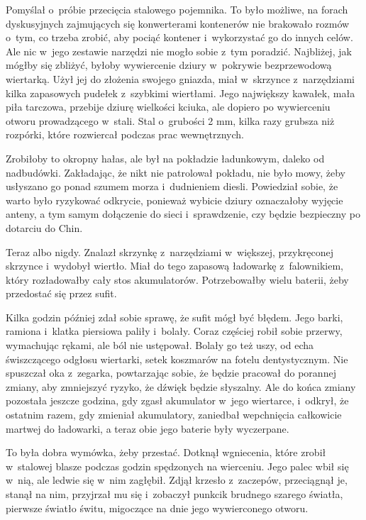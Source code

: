 \documentclass[oneside,polish,11pt,rmheadings]{mwbk}
\begin{document}
Pomyślał o~próbie przecięcia stalowego pojemnika. To było możliwe, na forach dyskusyjnych zajmujących się konwerterami kontenerów nie brakowało rozmów o~tym, co trzeba zrobić, aby pociąć kontener i~wykorzystać go do innych celów. Ale nic w~jego zestawie narzędzi nie mogło sobie z~tym poradzić. Najbliżej, jak mógłby się zbliżyć, byłoby wywiercenie dziury w~pokrywie bezprzewodową wiertarką. Użył jej do złożenia swojego gniazda, miał w~skrzynce z~narzędziami kilka zapasowych pudełek z~szybkimi wiertłami. Jego największy kawałek, mała piła tarczowa, przebije dziurę wielkości kciuka, ale dopiero po wywierceniu otworu prowadzącego w~stali. Stal o~grubości 2 mm, kilka razy grubsza niż rozpórki, które rozwiercał podczas prac wewnętrznych.

Zrobiłoby to okropny hałas, ale był na pokładzie ładunkowym, daleko od nadbudówki. Zakładając, że nikt nie patrolował pokładu, nie było mowy, żeby usłyszano go ponad szumem morza i~dudnieniem diesli. Powiedział sobie, że warto było ryzykować odkrycie, ponieważ wybicie dziury oznaczałoby wyjęcie anteny, a tym samym dołączenie do sieci i~sprawdzenie, czy będzie bezpieczny po dotarciu do Chin.

Teraz albo nigdy. Znalazł skrzynkę z~narzędziami w~większej, przykręconej skrzynce i~wydobył wiertło. Miał do tego zapasową ładowarkę z~falownikiem, który rozładowałby cały stos akumulatorów. Potrzebowałby wielu baterii, żeby przedostać się przez sufit.

Kilka godzin później zdał sobie sprawę, że sufit mógł być błędem. Jego barki, ramiona i~klatka piersiowa paliły i~bolały. Coraz częściej robił sobie przerwy, wymachując rękami, ale ból nie ustępował. Bolały go też uszy, od echa świszczącego odgłosu wiertarki, setek koszmarów na fotelu dentystycznym. Nie spuszczał oka z~zegarka, powtarzając sobie, że będzie pracował do porannej zmiany, aby zmniejszyć ryzyko, że dźwięk będzie słyszalny. Ale do końca zmiany pozostała jeszcze godzina, gdy zgasł akumulator w~jego wiertarce, i~odkrył, że ostatnim razem, gdy zmieniał akumulatory, zaniedbał wepchnięcia całkowicie martwej do ładowarki, a teraz obie jego baterie były wyczerpane.

To była dobra wymówka, żeby przestać. Dotknął wgniecenia, które zrobił w~stalowej blasze podczas godzin spędzonych na wierceniu. Jego palec wbił się w~nią, ale ledwie się w~nim zagłębił. Zdjął krzesło z~zaczepów, przeciągnął je, stanął na nim, przyjrzał mu się i~zobaczył punkcik brudnego szarego światła, pierwsze światło świtu, migoczące na dnie jego wywierconego otworu.
\end{document}
